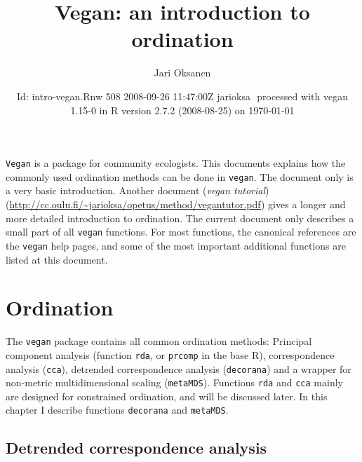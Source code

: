 \documentclass[a4paper,10pt]{amsart}
\title{Vegan: an introduction to ordination}
\author{Jari Oksanen}
\date{$ $Id: intro-vegan.Rnw 508 2008-09-26 11:47:00Z jarioksa $ $
  processed with vegan
1.15-0
in R version 2.7.2 (2008-08-25) on \today}
\begin{document}


\maketitle

\tableofcontents


\noindent \texttt{Vegan} is a package for community ecologists.  This
documents explains how the commonly used ordination methods can be
done in \texttt{vegan}.  The document only is a very basic
introduction.  Another document (\emph{vegan tutorial})
(\url{http://cc.oulu.fi/~jarioksa/opetus/method/vegantutor.pdf}) gives
a longer and more detailed introduction to ordination.  The
current document only describes a small part of all \texttt{vegan}
functions.  For most functions, the canonical references are the
\texttt{vegan} help pages, and some of the most important additional
functions are listed at this document.

\section{Ordination}

The \texttt{vegan} package contains all common ordination methods:
Principal component analysis (function \texttt{rda}, or
\texttt{prcomp} in the base \textsf{R}), correspondence analysis
(\texttt{cca}), detrended correspondence analysis (\texttt{decorana})
and a wrapper for non-metric multidimensional scaling
(\texttt{metaMDS}).  Functions \texttt{rda} and \texttt{cca} mainly
are designed for constrained ordination, and will be discussed later.
In this chapter I describe functions \texttt{decorana} and
\texttt{metaMDS}.

\subsection{Detrended correspondence analysis}
\end{document}
